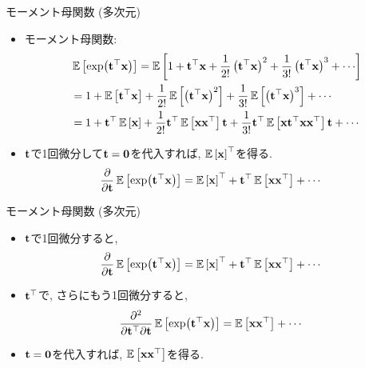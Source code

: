 \documentclass[dvipdfmx,notheorems,t]{beamer}
\begin{document}
\begin{frame}{モーメント母関数 (多次元)}
\begin{itemize}
  \item モーメント母関数:
  \begin{align*}
    & \E{\exp(\vb{t}^\top \vb{x})} = \E{1 + \vb{t}^\top \vb{x}
      + \frac{1}{2!} \left( \vb{t}^\top \vb{x} \right)^2
      + \frac{1}{3!} \left( \vb{t}^\top \vb{x} \right)^3 + \cdots} \\
    &= 1 + \E{\vb{t}^\top \vb{x}} + \frac{1}{2!} \E{\left( \vb{t}^\top \vb{x} \right)^2}
      + \frac{1}{3!} \E{\left( \vb{t}^\top \vb{x} \right)^3} + \cdots \\
    &= 1 + \vb{t}^\top \E{\vb{x}} + \frac{1}{2!} \vb{t}^\top \E{\vb{x} \vb{x}^\top} \vb{t}
      + \frac{1}{3!} \vb{t}^\top \E{\vb{x} \vb{t}^\top \vb{x} \vb{x}^\top} \vb{t} + \cdots
  \end{align*}
  \item $\vb{t}$で1回微分して$\vb{t} = \vb{0}$を代入すれば, $\operatorname{\mathbb{E}} \left[ \vb{x} \right]^\top$を得る.
  \begin{align*}
    \pdv{\vb{t}} \operatorname{\mathbb{E}} \left[ \exp(\vb{t}^\top \vb{x}) \right]
    &= \operatorname{\mathbb{E}} \left[ \vb{x} \right]^\top + \vb{t}^\top \operatorname{\mathbb{E}} \left[ \vb{x} \vb{x}^\top \right] + \cdots
  \end{align*}
\end{itemize}
\end{frame}

\begin{frame}{モーメント母関数 (多次元)}
\begin{itemize}
  \item $\vb{t}$で1回微分すると,
  \begin{align*}
    \pdv{\vb{t}} \operatorname{\mathbb{E}} \left[ \exp(\vb{t}^\top \vb{x}) \right]
    &= \operatorname{\mathbb{E}} \left[ \vb{x} \right]^\top + \vb{t}^\top \operatorname{\mathbb{E}} \left[ \vb{x} \vb{x}^\top \right] + \cdots
  \end{align*}
  \item $\vb{t}^\top$で, さらにもう1回微分すると,
  \begin{align*}
    \frac{\partial^2}{\partial \vb{t}^\top \partial \vb{t}} \operatorname{\mathbb{E}} \left[ \exp(\vb{t}^\top \vb{x}) \right]
    &= \operatorname{\mathbb{E}} \left[ \vb{x} \vb{x}^\top \right] + \cdots
  \end{align*}
  \item $\vb{t} = \vb{0}$を代入すれば, $\operatorname{\mathbb{E}} \left[ \vb{x} \vb{x}^\top \right]$を得る.
\end{itemize}
\end{frame}
\end{document}
